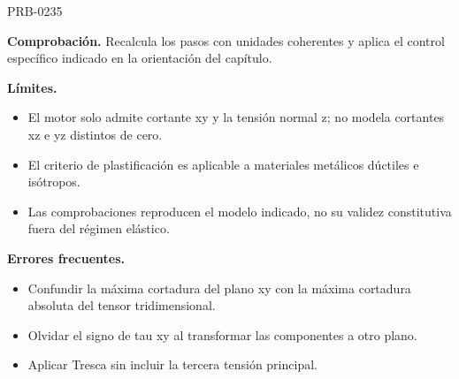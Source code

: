 \begin{studiumworked}{PRB-0235}
\par\textbf{Comprobación.} Recalcula los pasos con unidades coherentes y aplica el control específico indicado en la orientación del capítulo.

\textbf{Límites.}\begin{itemize}\item El motor solo admite cortante xy y la tensión normal z; no modela cortantes xz e yz distintos de cero.
\item El criterio de plastificación es aplicable a materiales metálicos dúctiles e isótropos.
\item Las comprobaciones reproducen el modelo indicado, no su validez constitutiva fuera del régimen elástico.\end{itemize}

\textbf{Errores frecuentes.}\begin{itemize}\item Confundir la máxima cortadura del plano xy con la máxima cortadura absoluta del tensor tridimensional.
\item Olvidar el signo de tau xy al transformar las componentes a otro plano.
\item Aplicar Tresca sin incluir la tercera tensión principal.\end{itemize}

\end{studiumworked}

\Needspace{.3\textheight}

